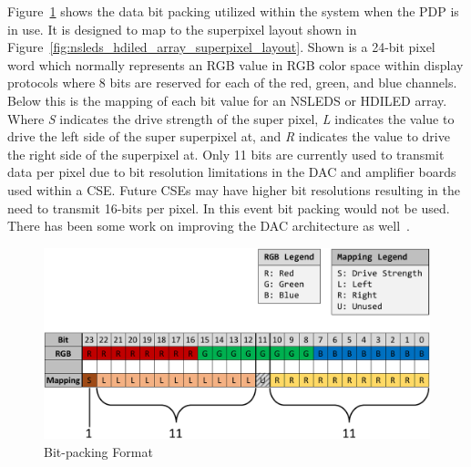     Figure~\ref{fig:bit_packing} shows the data bit packing utilized within the system when the PDP is in use. It is designed to map to the superpixel layout shown in Figure~\ref{fig:nsleds_hdiled_array_superpixel_layout}. Shown is a 24-bit pixel word which normally represents an RGB value in RGB color space within display protocols where 8 bits are reserved for each of the red, green, and blue channels. Below this is the mapping of each bit value for an NSLEDS or HDILED array. Where {\it S} indicates the drive strength of the super pixel, {\it L} indicates the value to drive the left side of the super superpixel at, and {\it R} indicates the value to drive the right side of the superpixel at. Only 11 bits are currently used to transmit data per pixel due to bit resolution limitations in the DAC and amplifier boards used within a CSE. Future CSEs may have higher bit resolutions resulting in the need to transmit 16-bits per pixel. In this event bit packing would not be used. There has been some work on improving the DAC architecture as well~\cite{EjzakEtAl2019}.

    \begin{figure}
        \centering
        \includegraphics[width=1.0\textwidth]{fig/bit_packing.pdf}
        \caption{Bit-packing Format}
        \label{fig:bit_packing}
    \end{figure}

